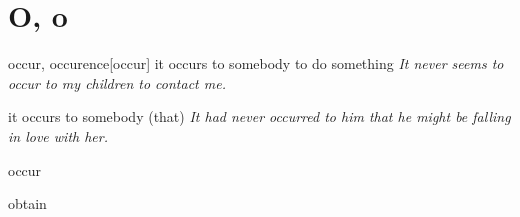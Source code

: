 \section{O, o}

\begin{DefWord}{occur, occurence}[occur]
    it occurs to somebody to do something 
    \textit{It never seems to occur to my children to contact me.}
    
    it occurs to somebody (that)
    \textit{It had never occurred to him that he might be falling in love with her.}
\end{DefWord}

\begin{DefWord}{occur}
\end{DefWord}

\begin{DefWord}{obtain}
\end{DefWord}